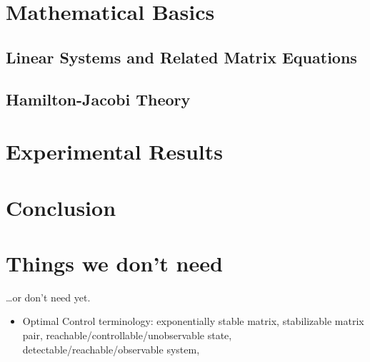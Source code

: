 \documentclass[
  bibliography=totoc,
  listof=totoc,
  oneside,
]{scrbook}
\begin{document}
\frontmatter



\cleardoublepage
{}
\tableofcontents
\listoffigures
\listoftodos
\todototoc

\mainmatter


\chapter{Mathematical Basics}
\section{Linear Systems and Related Matrix Equations}
\section{Hamilton-Jacobi Theory}






\chapter{Experimental Results}
\chapter{Conclusion}

\appendix



\chapter{Things we don't need}

\dots or don't need yet.
\begin{itemize}
  \item
    Optimal Control terminology:
    exponentially stable matrix,
    stabilizable matrix pair,
    reachable/controllable/unobservable state,
    detectable/reachable/observable system,
    \etc
\end{itemize}

\backmatter
\glsaddallunused
\printglossaries
\printbibliography
\end{document}
